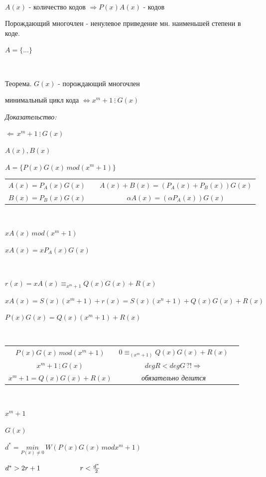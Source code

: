 \documentclass[12pt]{article}
\begin{document}
$ $\par
$A(x)$ - количество кодов $\Rightarrow P(x)A(x)$ - кодов\par
Порождающий многочлен - ненулевое приведение мн. наименьшей степени в коде.\par
$A = \{ ... \}$\par
$ $\par
Теорема. $G(x)$ - порождающий многочлен\par
минимальный цикл кода $\Leftrightarrow x^m + 1 \ \vdots\  G(x)$\par
\textit{Доказательство:}\par
$\Leftarrow \, x^m+1 \ \vdots\  G(x)$\par
$A(x),B(x)$\par
$A=\{ P(x)G(x) \, mod(x^m +1 )\}$\par
\begin{tabular}{ccc}
    $A(x) = P_A(x)G(x)$ &  & $A(x)+B(x) = (P_A(x)+P_B(x))G(x)$   \\
    $B(x) = P_B(x)G(x)$ &  & $\alpha A(x) = (\alpha P_A(x))G(x)$ \\
\end{tabular}\par
$ $\par
$xA(x) \, mod(x^m+1)$\par
$xA(x) = xP_A(x)G(x)$\par
$ $\par
$r(x) = xA(x) \equiv _{x^m+1} Q(x)G(x)+R(x)$\par
$xA(x) = S(x)(x^m+1)+r(x)=S(x)(x^n+1)+Q(x)G(x)+R(x)$\par
$P(x)G(x)=Q(x)(x^m+1)+R(x)$\par
$ $\par
\begin{tabular}{ccc}
    $P(x)G(x) \, mod(x^m+1)$ & $0 \equiv _{(x^m+1)}Q(x)G(x)+R(x)$ \\
    $x^m+1 \ \vdots\  G(x)$  & $degR < deg G \, ?! \Rightarrow$   \\
    $x^m+1 = Q(x)G(x)+R(x)$  & \textit{обязательно делится}       \\
\end{tabular}\par
$ $\par
$x^m+1$\par
$G(x)$\par
$d^* = \overset{}{\underset{P(x) \neq 0}{min}} \, W(P(x)G(x) \, mod x^m+1)$\par
$d^* > 2r+1 \hspace{2 cm} r < \frac{d^*}{2}$\par
\end{document}
